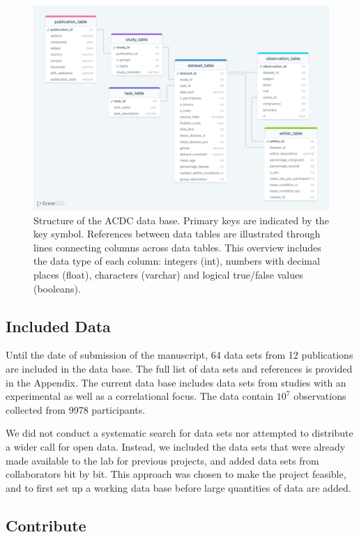 \documentclass[
  man,floatsintext]{apa6}
\begin{document}
\begin{figure}
\centering
\includegraphics{images/db_structure.png}
\caption{\label{fig:figure2}Structure of the ACDC data base. Primary keys are indicated by the key symbol. References between data tables are illustrated through lines connecting columns across data tables. This overview includes the data type of each column: integers (int), numbers with decimal places (float), characters (varchar) and logical true/false values (booleans).}
\end{figure}

\hypertarget{included-data}{%
\subsection{Included Data}\label{included-data}}

Until the date of submission of the manuscript, 64 data sets from 12 publications are included in the data base. The full list of data sets and references is provided in the Appendix. The current data base includes data sets from studies with an experimental as well as a correlational focus. The data contain \(10^ 7\) observations collected from 9978 participants.

We did not conduct a systematic search for data sets nor attempted to distribute a wider call for open data. Instead, we included the data sets that were already made available to the lab for previous projects, and added data sets from collaborators bit by bit. This approach was chosen to make the project feasible, and to first set up a working data base before large quantities of data are added.

\hypertarget{contribute}{%
\subsection{Contribute}\label{contribute}}
\end{document}
